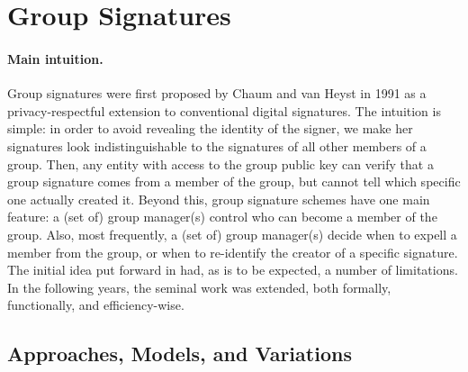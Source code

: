 \section{Group Signatures}
\label{sec:gs}

\paragraph{Main intuition.}
%
Group signatures were first proposed by Chaum and van Heyst in 1991 \cite{ch91}
as a privacy-respectful extension to conventional digital signatures.
The intuition is simple: in order to avoid revealing the identity of the signer,
we make her signatures look indistinguishable to the signatures of all other
members of a group. Then, any entity with access to the group public key can
verify that a group signature comes from a member of the group, but cannot
tell which specific one actually created it.
%
Beyond this, group signature schemes have one main feature: a (set of) group
manager(s) control who can become a member of the group. Also, most frequently,
a (set of) group manager(s) decide when to expell a member from the group, or
when to re-identify the creator of a specific signature.
%
The initial idea put forward in \cite{ch91} had, as is to be expected, a number
of limitations. In the following years, the seminal work was extended, both
formally, functionally, and efficiency-wise.

\subsection{Approaches, Models, and Variations}
\label{ssec:gsapproach}

